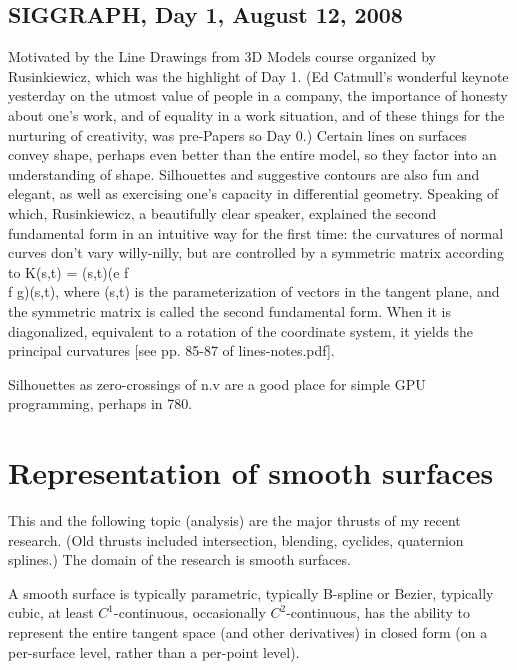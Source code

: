 \documentclass[11pt]{article}
\begin{document}
\subsection{SIGGRAPH, Day 1, August 12, 2008}

Motivated by the Line Drawings from 3D Models course organized by Rusinkiewicz,
which was the highlight of Day 1.  (Ed Catmull's wonderful keynote yesterday on
the utmost value of people in a company, the
importance of honesty about one's work, and of equality in a work situation, and
of these things for the nurturing of creativity, was pre-Papers so Day 0.)
Certain lines on surfaces convey shape, perhaps even better than the entire
model, so they factor into an understanding of shape.
Silhouettes and suggestive contours are also fun and elegant,
as well as exercising one's capacity in differential geometry.
Speaking of which, Rusinkiewicz, a beautifully clear speaker, explained
the second fundamental form in an intuitive way for the first time: the 
curvatures of normal curves don't vary willy-nilly, but are controlled
by a symmetric matrix according to K(s,t) = (s,t)(e f\\f g)(s,t), 
where (s,t) is the parameterization of vectors in the tangent plane,
and the symmetric matrix is called the second fundamental form.
When it is diagonalized, equivalent to a rotation of the coordinate system,
it yields the principal curvatures [see pp. 85-87 of lines-notes.pdf].

Silhouettes as zero-crossings of n.v are a good place for 
simple GPU programming, perhaps in 780.



\section{Representation of smooth surfaces}

This and the following topic (analysis) are the major thrusts of my recent research.
(Old thrusts included intersection, blending, cyclides, quaternion splines.)
The domain of the research is smooth surfaces.

A smooth surface is typically parametric, typically B-spline or Bezier, typically cubic,
at least $C^1$-continuous, occasionally $C^2$-continuous, 
has the ability to represent the entire tangent space (and other derivatives) in closed form
(on a per-surface level, rather than a per-point level).
\end{document}
